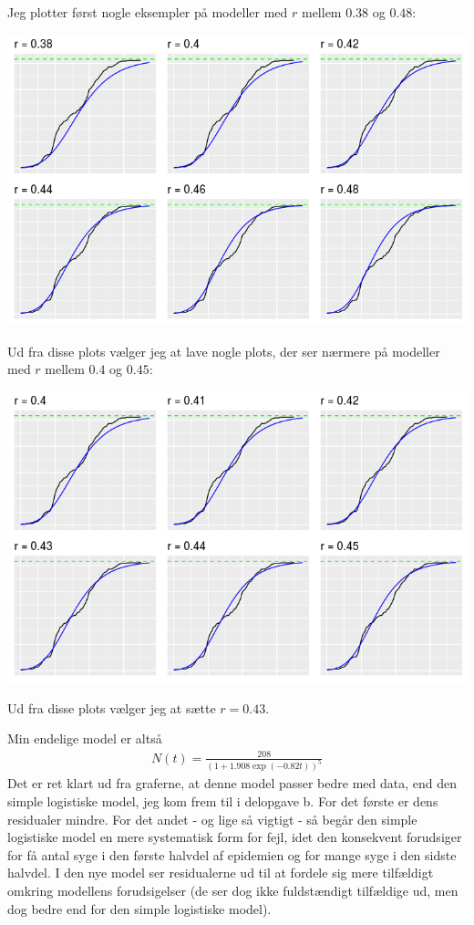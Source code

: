 \documentclass[12pt]{article}
\begin{document}
\begin{enumerate}
Jeg plotter først nogle eksempler på modeller med $r$ mellem $0.38$ og $0.48$:
\begin{center}
\includegraphics[scale=0.5]{q2p9.png}
\end{center}
Ud fra disse plots vælger jeg at lave nogle plots, der ser nærmere på modeller med $r$ mellem $0.4$ og $0.45$:
\begin{center}
\includegraphics[scale=0.5]{q2p10.png}
\end{center}
Ud fra disse plots vælger jeg at sætte $r=0.43$.

Min endelige model er altså
\begin{align}
N(t) = \frac{208}{(1 + 1.908\exp(-0.82 t) )^5}
\end{align}
Det er ret klart ud fra graferne, at denne model passer bedre med data, end den simple logistiske model, jeg kom frem til i delopgave b. For det første er dens residualer mindre. For det andet - og lige så vigtigt - så begår den simple logistiske model en mere systematisk form for fejl, idet den konsekvent forudsiger for få antal syge i den første halvdel af epidemien og for mange syge i den sidste halvdel. I den nye model ser residualerne ud til at fordele sig mere tilfældigt omkring modellens forudsigelser (de ser dog ikke fuldstændigt tilfældige ud, men dog bedre end for den simple logistiske model).


\end{enumerate}
\end{document}
